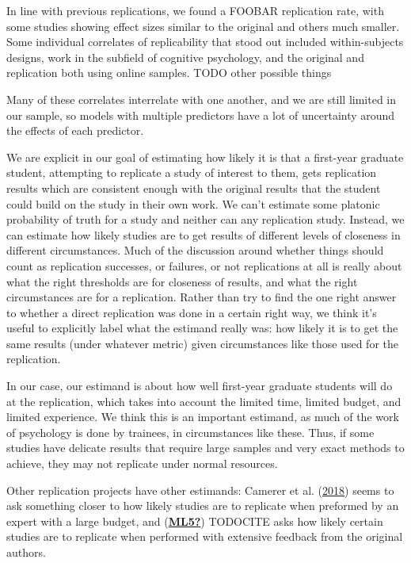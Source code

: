 \documentclass[
  english,
  a4paper,
]{article}
\begin{document}
In line with previous replications, we found a FOOBAR replication rate, with some studies showing effect sizes similar to the original and others much smaller. Some individual correlates of replicability that stood out included within-subjects designs, work in the subfield of cognitive psychology, and the original and replication both using online samples. TODO other possible things

Many of these correlates interrelate with one another, and we are still limited in our sample, so models with multiple predictors have a lot of uncertainty around the effects of each predictor.

We are explicit in our goal of estimating how likely it is that a first-year graduate student, attempting to replicate a study of interest to them, gets replication results which are consistent enough with the original results that the student could build on the study in their own work. We can't estimate some platonic probability of truth for a study and neither can any replication study. Instead, we can estimate how likely studies are to get results of different levels of closeness in different circumstances. Much of the discussion around whether things should count as replication successes, or failures, or not replications at all is really about what the right thresholds are for closeness of results, and what the right circumstances are for a replication. Rather than try to find the one right answer to whether a direct replication was done in a certain right way, we think it's useful to explicitly label what the estimand really was: how likely it is to get the same results (under whatever metric) given circumstances like those used for the replication.

In our case, our estimand is about how well first-year graduate students will do at the replication, which takes into account the limited time, limited budget, and limited experience. We think this is an important estimand, as much of the work of psychology is done by trainees, in circumstances like these. Thus, if some studies have delicate results that require large samples and very exact methods to achieve, they may not replicate under normal resources.

Other replication projects have other estimands: Camerer et al. (\protect\hyperlink{ref-camerer2018}{2018}) seems to ask something closer to how likely studies are to replicate when preformed by an expert with a large budget, and (\protect\hyperlink{ref-ML5}{\textbf{ML5?}}) TODOCITE asks how likely certain studies are to replicate when performed with extensive feedback from the original authors.
\end{document}
